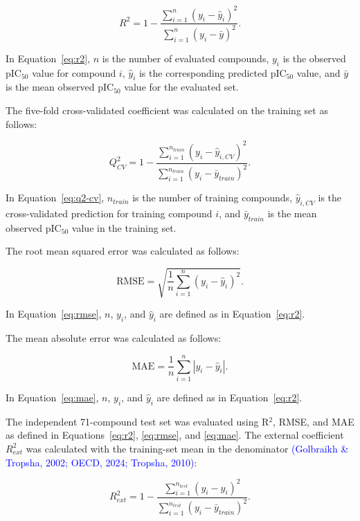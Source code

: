 \documentclass[11pt]{article}
\begin{document}
\begin{equation}
R^2 = 1 - \frac{\sum_{i=1}^{n}(y_i - \hat{y}_i)^2}{\sum_{i=1}^{n}(y_i - \bar{y})^2}.
\label{eq:r2}
\end{equation}

In Equation~\ref{eq:r2}, $n$ is the number of evaluated compounds, $y_i$ is the observed pIC$_{50}$ value for compound $i$, $\hat{y}_i$ is the corresponding predicted pIC$_{50}$ value, and $\bar{y}$ is the mean observed pIC$_{50}$ value for the evaluated set.

The five-fold cross-validated coefficient was calculated on the training set as follows:

\begin{equation}
Q^2_{CV} = 1 - \frac{\sum_{i=1}^{n_{train}}(y_i - \hat{y}_{i,CV})^2}{\sum_{i=1}^{n_{train}}(y_i - \bar{y}_{train})^2}.
\label{eq:q2-cv}
\end{equation}

In Equation~\ref{eq:q2-cv}, $n_{train}$ is the number of training compounds, $\hat{y}_{i,CV}$ is the cross-validated prediction for training compound $i$, and $\bar{y}_{train}$ is the mean observed pIC$_{50}$ value in the training set.

The root mean squared error was calculated as follows:

\begin{equation}
\mathrm{RMSE} = \sqrt{\frac{1}{n}\sum_{i=1}^{n}(y_i - \hat{y}_i)^2}.
\label{eq:rmse}
\end{equation}

In Equation~\ref{eq:rmse}, $n$, $y_i$, and $\hat{y}_i$ are defined as in Equation~\ref{eq:r2}.

The mean absolute error was calculated as follows:

\begin{equation}
\mathrm{MAE} = \frac{1}{n}\sum_{i=1}^{n}|y_i - \hat{y}_i|.
\label{eq:mae}
\end{equation}

In Equation~\ref{eq:mae}, $n$, $y_i$, and $\hat{y}_i$ are defined as in Equation~\ref{eq:r2}.

The independent 71-compound test set was evaluated using R$^2$, RMSE, and MAE as defined in Equations~\ref{eq:r2}, \ref{eq:rmse}, and \ref{eq:mae}. The external coefficient $R^2_{ext}$ was calculated with the training-set mean in the denominator \textcolor{blue}{(Golbraikh \& Tropsha, 2002; OECD, 2024; Tropsha, 2010)}:

\begin{equation}
R^2_{ext} = 1 - \frac{\sum_{i=1}^{n_{test}}(y_i - \hat{y}_i)^2}{\sum_{i=1}^{n_{test}}(y_i - \bar{y}_{train})^2}.
\label{eq:r2-ext}
\end{equation}
\end{document}

